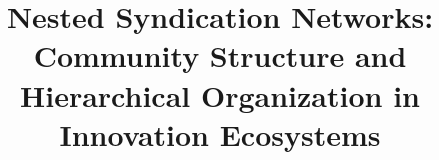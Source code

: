 \documentclass[12pt]{article}
\begin{document}
\title{Nested Syndication Networks: Community Structure and Hierarchical Organization in Innovation Ecosystems}
\author{}
\date{}
\maketitle
\newpage


\newpage

\tableofcontents
\newpage

{
\setlength{\parskip}{0.7em}

\newpage


\newpage


\newpage


\newpage


\newpage
}



\end{document}
